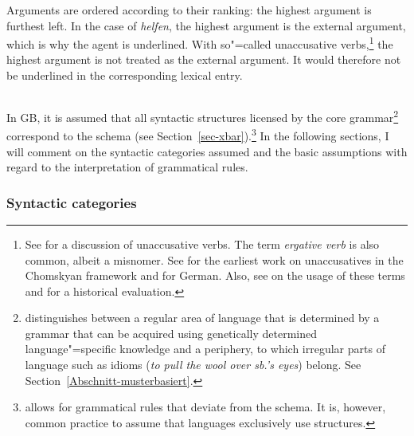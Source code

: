 Arguments are ordered according to their ranking: the highest argument is furthest left. In the case
of \emph{helfen}, the highest argument is the external argument, which is why the agent is underlined. With so"=called unaccusative verbs,\footnote{%
See  for a discussion of unaccusative verbs. The term \emph{ergative verb} is also common, albeit
a misnomer. See  for the earliest work on unaccusatives in the Chomskyan framework and 
 for German. Also, see  on the usage of these terms and for a historical evaluation.
}
the highest argument is not treated as the external argument. It would therefore not be underlined in the corresponding lexical entry.

\subsection{\xbart}
\label{Abschnitt-X-Bar}

In GB, it is assumed that all syntactic structures licensed by the core grammar\footnote{%
 \citet[--8]{Chomsky81a} distinguishes between a regular area of language that is determined by a grammar that
 can be acquired using genetically determined language"=specific knowledge and a periphery, to which irregular parts
 of language such as idioms (\eg \emph{to pull the wool over sb.'s eyes}) belong. See Section~\ref{Abschnitt-musterbasiert}.
}
correspond to the \xbar schema (see Section~\ref{sec-xbar}).\footnote{%
   \citet[]{Chomsky70a} allows for grammatical rules that deviate from the \xbar schema.
   It is, however, common practice to assume that languages exclusively use \xbar structures.
}
In the following sections, I will comment on the syntactic categories assumed and the basic assumptions with regard to
the interpretation of grammatical rules. 

\subsubsection{Syntactic categories}
\label{GB-syntaktische-categoryn}

